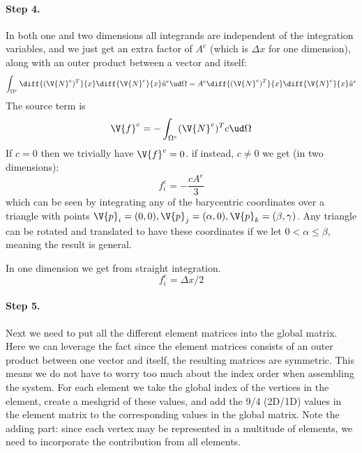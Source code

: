 \documentclass[sigconf]{acmart}
\begin{document}
\paragraph{Step 4.} In both one and two dimensions all integrands are independent of the integration variables, and we just get an extra factor of $ A^e $ (which is $ \Delta x $ for one dimension), along with an outer product between a vector and itself:
\begin{equation}\label{key}
	\int_{\Omega^e} \diff{(\V{N}^e)^T}{x} \diff{\V{N}^e}{x} \hat{u}^e \ud \Omega = A^e \diff{(\V{N}^e)^T}{x} \diff{\V{N}^e}{x} \hat{u}^e
\end{equation}
The source term is 
\begin{equation}\label{key}
	\V{f}^e = -\int_{\Omega^e} (\V{N}^e)^T c \ud \Omega
\end{equation}
If $ c = 0 $ then we trivially have $ \V{f}^e = 0 $. if instead, $ c \neq 0 $ we get (in two dimensions):
\begin{equation}\label{key}
	f^e_i = -\frac{cA^e}{3}
\end{equation}
which can be seen by integrating any of the barycentric coordinates over a triangle with points $ \V{p}_i = (0,0), \V{p}_j = (\alpha, 0), \V{p}_k = (\beta, \gamma) $. Any triangle can be rotated and translated to have these coordinates if we let $ 0 < \alpha \leq \beta $, meaning the result is general.

In one dimension we get from straight integration.
\begin{equation}\label{key}
	f^e_i = \Delta x / 2
\end{equation}



\paragraph{Step 5.} Next we need to put all the different element matrices into the global matrix. Here we can leverage the fact since the element matrices consists of an outer product between one vector and itself, the resulting matrices are symmetric. This means we do not have to worry too much about the index order when assembling the system. For each element we take the global index of the vertices in the element, create a meshgrid of these values, and add the 9/4 (2D/1D) values in the element matrix to the corresponding values in the global matrix. Note the adding part: since each vertex may be represented in a multitude of elements, we need to incorporate the contribution from all elements.
\end{document}
